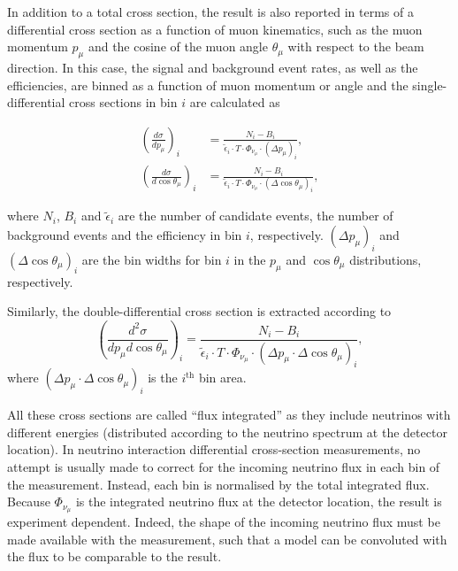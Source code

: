 In addition to a total cross section, the result is also reported in terms of a differential cross section as a function of muon kinematics, such as the muon momentum $p_\mu$ and the cosine of the muon angle $\theta_\mu$ with respect to the beam direction. In this case, the signal and background event rates, as well as the efficiencies, are binned as a function of muon momentum or angle and the single-differential cross sections in bin $i$ are calculated as

\begin{equation}
\label{eq:xsec_differential}
\begin{split}
\left ( \frac{d\sigma}{dp_\mu} \right )_i &= \frac{N_i - B_i}{\tilde{\epsilon}_i \cdot T \cdot \Phi_{\nu_\mu} \cdot (\Delta p_\mu)_i}, \\
\left ( \frac{d\sigma}{d\cos\theta_\mu} \right )_i &= \frac{N_i - B_i}{\tilde{\epsilon}_i \cdot T \cdot \Phi_{\nu_\mu} \cdot (\Delta \cos\theta_\mu)_i},
\end{split}
\end{equation}

where $N_i$, $B_i$ and $\tilde{\epsilon}_i$ are the number of candidate events, the number of background events and the efficiency in bin $i$, respectively. $(\Delta p_\mu)_i$ and $(\Delta \cos\theta_\mu)_i$ are the bin widths for bin $i$ in the $p_\mu$ and $\cos\theta_\mu$ distributions, respectively. 

Similarly, the double-differential cross section is extracted according to
\begin{equation}
\label{eq:xsec_double_differential}
\left ( \frac{d^2\sigma}{dp_\mu d\cos\theta_\mu} \right )_{i} = \frac{N_{i} - B_{i}}{\tilde{\epsilon}_{i} \cdot T \cdot \Phi_{\nu_\mu} \cdot (\Delta p_\mu\cdot \Delta \cos\theta_\mu)_i},
\end{equation}
where $(\Delta p_\mu\cdot \Delta \cos\theta_\mu)_i$ is the $i^\text{th}$ bin area.

All these cross sections are called ``flux integrated'' as they include neutrinos with different energies (distributed according to the neutrino spectrum at the detector location). In neutrino interaction differential cross-section measurements, no attempt is usually made to correct for the incoming neutrino flux in each bin of the measurement. Instead, each bin is normalised by the total integrated flux. Because $\Phi_{\nu_\mu}$ is the integrated neutrino flux at the detector location, the result is experiment dependent. Indeed, the shape of the incoming neutrino flux must be made available with the measurement, such that a model can be convoluted with the flux to be comparable to the result.


